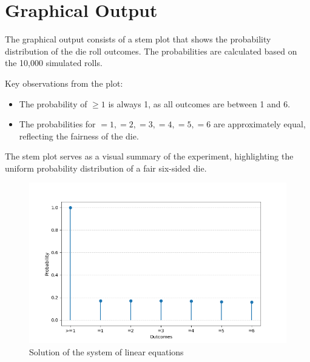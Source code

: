 \documentclass[journal]{IEEEtran}
\begin{document}
	\section*{Graphical Output}
	The graphical output consists of a stem plot that shows the probability distribution of the die roll outcomes. The probabilities are calculated based on the 10,000 simulated rolls.
	
	Key observations from the plot:
	\begin{itemize}
		\item The probability of \( \geq 1 \) is always 1, as all outcomes are between 1 and 6.
		\item The probabilities for \( =1, =2, =3, =4, =5, =6 \) are approximately equal, reflecting the fairness of the die.
	\end{itemize}
	
	The stem plot serves as a visual summary of the experiment, highlighting the uniform probability distribution of a fair six-sided die.
	\begin{figure}[h!]
		\centering
		\includegraphics[width=\columnwidth]{figs/Fig.png}
		\caption{Solution of the system of linear equations}
		\label{stemplot}
	\end{figure}
	
\end{document}
